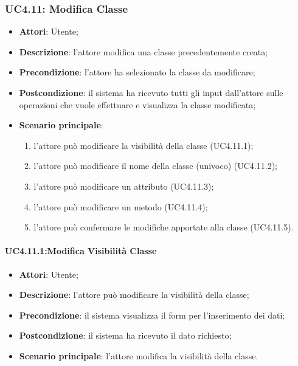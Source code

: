 \begin{itemize}
\begin{itemize}
\begin{itemize}
\begin{itemize}
\subsubsection{UC4.11: Modifica Classe}
\label{UC4.11}
\begin{itemize}
	\item \textbf{Attori}: Utente;
	\item \textbf{Descrizione}: l'attore modifica una classe precedentemente creata;
	\item \textbf{Precondizione}: l'attore ha selezionato la classe da modificare;
	\item \textbf{Postcondizione}: il sistema ha ricevuto tutti gli input dall'attore sulle operazioni che vuole effettuare e visualizza la classe modificata;
	\item \textbf{Scenario principale}:
	\begin{enumerate}
		\item l'attore può modificare la visibilità della classe (UC4.11.1);
		\item l'attore può modificare il nome della classe (univoco) (UC4.11.2);
		\item l'attore può modificare un attributo (UC4.11.3);
		\item l'attore può modificare un metodo (UC4.11.4);
		\item l'attore può confermare le modifiche apportate alla classe (UC4.11.5).
	\end{enumerate}
\end{itemize}

\paragraph{UC4.11.1:Modifica Visibilità Classe}
\label{UC4.11.1} %
\begin{itemize}
	\item \textbf{Attori}: Utente;
	\item \textbf{Descrizione}: l'attore può modificare la visibilità della classe;
	\item \textbf{Precondizione}: il sistema visualizza il form per l'inserimento dei dati;
	\item \textbf{Postcondizione}: il sistema ha ricevuto il dato richiesto;
	\item \textbf{Scenario principale}: l'attore modifica la visibilità della classe.
\end{itemize}


\end{itemize}
\end{itemize}
\end{itemize}
\end{itemize}

